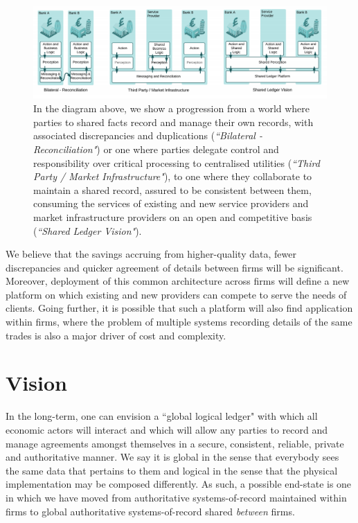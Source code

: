 \documentclass{article}
\begin{document}
\begin{figure}[H]
\includegraphics[scale=.5, center]{sharedlogic} 
\caption{In the diagram above, we show a progression from a world where parties to shared facts record and manage their own records, with associated discrepancies and duplications (\textit{``Bilateral - Reconciliation"}) or one where parties delegate control and responsibility over critical processing to centralised utilities (\textit{``Third Party / Market Infrastructure"}), to one where they collaborate to maintain a shared record, assured to be consistent between them, consuming the services of existing and new service providers and market infrastructure providers on an open and competitive basis (\textit{``Shared Ledger Vision"}).}
\end{figure}


We believe that the savings accruing from higher-quality data, fewer discrepancies and quicker agreement of details between firms will be significant. Moreover, deployment of this common architecture across firms will define a new platform on which existing and new providers can compete to serve the needs of clients. Going further, it is possible that such a platform will also find application within firms, where the problem of multiple systems recording details of the same trades is also a major driver of cost and complexity.

\section{Vision}
In the long-term, one can envision a ``global logical ledger" with which all economic actors will interact and which will allow any parties to record and manage agreements amongst themselves in a secure, consistent, reliable, private and authoritative manner. We say it is global in the sense that everybody sees the same data that pertains to them and logical in the sense that the physical implementation may be composed differently. As such, a possible end-state is one in which we have moved from authoritative systems-of-record maintained within firms to global authoritative systems-of-record shared \textit{between} firms. 
\end{document}
